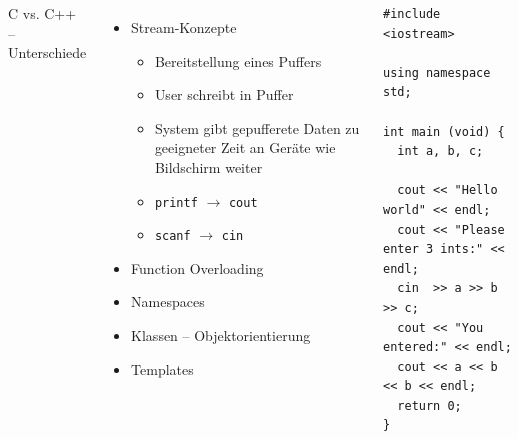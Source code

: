 \begin{frame}[fragile]
%
\begin{columns}[T]
\begin{Large}
{C vs. C++ -- Unterschiede}
\vspace{10pt}
\end{Large}
%
\begin{itemize}
\item Stream-Konzepte
	\begin{itemize}
	\item Bereitstellung eines Puffers
	\item User schreibt in Puffer
	\item System gibt gepufferete Daten zu geeigneter Zeit an Geräte wie Bildschirm weiter
	\item \texttt{printf} $\rightarrow$ \texttt{cout}
	\item \texttt{scanf}  $\rightarrow$ \texttt{cin}
	\end{itemize}
\item Function Overloading
\item Namespaces
\item Klassen -- Objektorientierung
\item Templates
\end{itemize}
%
\begin{codebox}
\begin{verbatim}
#include <iostream>

using namespace std;

int main (void) {
  int a, b, c;
  
  cout << "Hello world" << endl;
  cout << "Please enter 3 ints:" << endl;
  cin  >> a >> b >> c;
  cout << "You entered:" << endl;
  cout << a << b << b << endl;
  return 0;
}
\end{verbatim}
\end{codebox}
\end{columns}
%
\end{frame}


